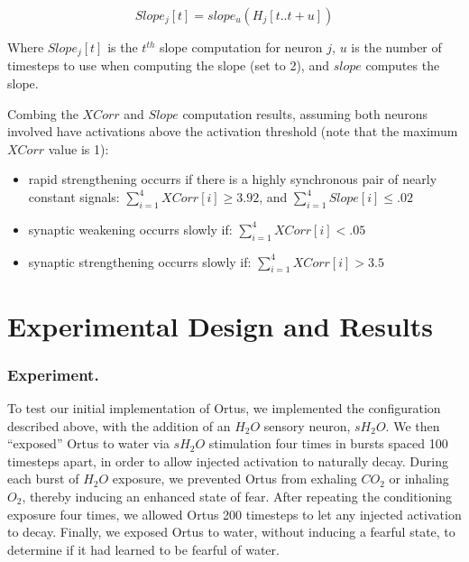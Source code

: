 \documentclass[letterpaper]{article}
\begin{document}
\begin{equation}
    \label{eq:slope}
    Slope_j[t] =  slope_u(H_{j}[t..t+u])
\end{equation}

Where $Slope_j[t]$ is the $t^{th}$ slope computation for neuron $j$, $u$ is the number of timesteps to use when computing the slope (set to 2), and $slope$ computes the slope.

Combing the $XCorr$ and $Slope$ computation results, assuming both neurons involved have activations above the activation threshold (note that the maximum $XCorr$ value is 1):

\begin{itemize}
    \itemsep0em
    \item rapid strengthening occurrs if there is a highly synchronous pair of nearly constant signals:
        \subitem $\sum_{i=1}^{4}{ XCorr[i]} \ge 3.92$, and
        \subitem $\sum_{i=1}^{4}{ Slope[i]} \le .02$
    \item synaptic weakening occurrs slowly if:
        \subitem $\sum_{i=1}^{4}{ XCorr[i]} < .05$
    \item synaptic strengthening occurrs slowly if:
        \subitem $\sum_{i=1}^{4}{ XCorr[i]} > 3.5$
\end{itemize}

\section{Experimental Design and Results}

\subsubsection{Experiment.} To test our initial implementation of Ortus, we implemented the configuration described above, with the addition of an $H_2O$ sensory neuron, $sH_2O$.
We then ``exposed'' Ortus to water via $sH_2O$ stimulation four times in bursts spaced 100 timesteps apart, in order to allow injected activation to naturally decay.
During each burst of $H_2O$ exposure, we prevented Ortus from exhaling $CO_2$ or inhaling $O_2$, thereby inducing an enhanced state of fear.
After repeating the conditioning exposure four times, we allowed Ortus 200 timesteps to let any injected activation to decay.
Finally, we exposed Ortus to water, without inducing a fearful state, to determine if it had learned to be fearful of water.
\end{document}
